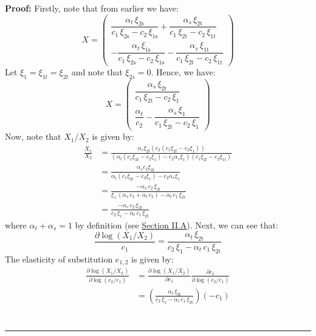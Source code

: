 \documentclass[11pt,a4paper,leqno]{extarticle}
\newenvironment{proof}[1][Proof]{\noindent\textbf{#1:} }{\ \rule{0.5em}{0.5em}}
\begin{document}
	
	
	\begin{proof}
		Firstly, note that from earlier we have:
		$$
		X = \begin{pmatrix}
		\dfrac{\alpha _{t}\,\xi _{\mathrm{2s}}}{c_{1}\,\xi _{\mathrm{2s}}-c_{2}\,\xi _{\mathrm{1s}}}+\dfrac{\alpha _{s}\,\xi _{\mathrm{2t}}}{c_{1}\,\xi _{\mathrm{2t}}-c_{2}\,\xi _{\mathrm{1t}}} \\[2ex] 
		-\dfrac{\alpha _{t}\,\xi _{\mathrm{1s}}}{c_{1}\,\xi _{\mathrm{2s}}-c_{2}\,\xi _{\mathrm{1s}}}-\dfrac{\alpha _{s}\,\xi _{\mathrm{1t}}}{c_{1}\,\xi _{\mathrm{2t}}-c_{2}\,\xi _{\mathrm{1t}}}
		\end{pmatrix}
		$$
		Let $\xi_1 = \xi_{1t} = \xi_{2t}$ and note that $\xi_{2s} = 0$. Hence, we have:
		$$
		X = \begin{pmatrix}
		\dfrac{\alpha _{s}\,\xi _{\mathrm{2t}}}{c_{1}\,\xi _{\mathrm{2t}}-c_{2}\,\xi _{\mathrm{1}}} \\
		\dfrac{\alpha _{t}}{c_{2}}-\dfrac{\alpha _{s}\,\xi _{\mathrm{1}}}{c_{1}\,\xi _{\mathrm{2t}}-c_{2}\,\xi _{\mathrm{1}}}
		\end{pmatrix}
		$$
		Now, note that $X_1/X_2$ is given by:
		\begin{align*}
		\frac{X_1}{X_2} &= \frac{\alpha_s \xi_{2t} \left( c_2 ( c_1 \xi_{2t} - c_2 \xi_{1} ) \right)}{ \left( \alpha_t (c_1 \xi_{2t} - c_2 \xi_{1}) -  c_2 \alpha_s \xi_1 \right) (c_1 \xi_{2t} - c_2 \xi_{1t})}  \\
		&= \frac{\alpha_s c_2 \xi_{2t}}{ \alpha_t (c_1 \xi_{2t} - c_2 \xi_{1}) -  c_2 \alpha_s \xi_1 }\\
		&= \frac{-\alpha _{s}\,c_{2}\,\xi _{\mathrm{2t}}}{\xi _{1}\,\left(\alpha _{s}\,c_{2}+\alpha _{t}\,c_{2}\right)-\alpha _{t}\,c_{1}\,\xi _{\mathrm{2t}}} \\
		&= \frac{-\alpha _{s}\,c_{2}\,\xi _{\mathrm{2t}}}{c_2\,\xi_1-\alpha _{t}\,c_{1}\,\xi _{\mathrm{2t}}}
		\end{align*}
		where $\alpha_t + \alpha_s = 1$ by definition (see \hyperref[sec:consumers]{Section II.A}).  Next, we can see that:
		$$
		\frac{\partial \log(X_1/X_2)}{c_1} = \frac{\alpha _{t}\,\xi _{\mathrm{2t}}}{c_2\,\xi_1-\alpha _{t}\,c_{1}\,\xi _{\mathrm{2t}}}
		$$
		The elasticity of substitution $e_{1,2}$ is given by:
		\begin{align*}
		\frac{\partial \log(X_1/X_2)}{\partial \log(c_2/c_1)} &= \frac{\partial \log(X_1/X_2)}{\partial c_1}\frac{\partial c_1}{\partial \log(c_2/c_1)} \\
		&= \left( \frac{\alpha _{t}\,\xi _{\mathrm{2t}}}{c_2\,\xi_1-\alpha _{t}\,c_{1}\,\xi _{\mathrm{2t}}} \right) \left( -c_1 \right)  \\

\end{align*}
\end{proof}
\end{document}
